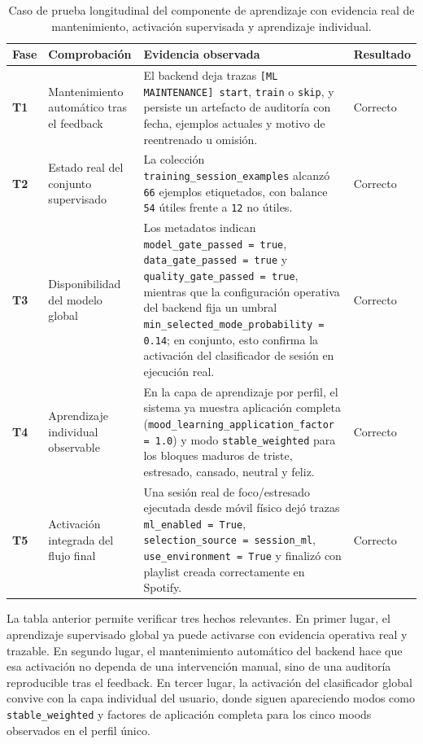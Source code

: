 \begin{table}[H]
\centering
\small
\renewcommand{\arraystretch}{1.1}
\begin{tabularx}{\textwidth}{|P{1.6cm}|P{3.2cm}|Y|P{2.2cm}|}
\hline
\textbf{Fase} & \textbf{Comprobación} & \textbf{Evidencia observada} & \textbf{Resultado} \\
\hline
\textbf{T1} & Mantenimiento automático tras el feedback & El backend deja trazas \texttt{[ML MAINTENANCE] start}, \texttt{train} o \texttt{skip}, y persiste un artefacto de auditoría con fecha, ejemplos actuales y motivo de reentrenado u omisión. & Correcto \\
\hline
\textbf{T2} & Estado real del conjunto supervisado & La colección \texttt{training\_session\_examples} alcanzó \texttt{66} ejemplos etiquetados, con balance \texttt{54} útiles frente a \texttt{12} no útiles. & Correcto \\
\hline
\textbf{T3} & Disponibilidad del modelo global & Los metadatos indican \texttt{model\_gate\_passed = true}, \texttt{data\_gate\_passed = true} y \texttt{quality\_gate\_passed = true}, mientras que la configuración operativa del backend fija un umbral \texttt{min\_selected\_mode\_probability = 0.14}; en conjunto, esto confirma la activación del clasificador de sesión en ejecución real. & Correcto \\
\hline
\textbf{T4} & Aprendizaje individual observable & En la capa de aprendizaje por perfil, el sistema ya muestra aplicación completa (\texttt{mood\_learning\_application\_factor = 1.0}) y modo \texttt{stable\_weighted} para los bloques maduros de triste, estresado, cansado, neutral y feliz. & Correcto \\
\hline
\textbf{T5} & Activación integrada del flujo final & Una sesión real de foco/estresado ejecutada desde móvil físico dejó trazas \texttt{ml\_enabled = True}, \texttt{selection\_source = session\_ml}, \texttt{use\_environment = True} y finalizó con playlist creada correctamente en Spotify. & Correcto \\
\hline
\end{tabularx}
\caption{Caso de prueba longitudinal del componente de aprendizaje con evidencia real de mantenimiento, activación supervisada y aprendizaje individual.}
\label{tab:caso_prueba_ml_longitudinal}
\end{table}

La tabla anterior permite verificar tres hechos relevantes. En primer lugar, el
aprendizaje supervisado global ya puede activarse con evidencia operativa real
y trazable. En segundo lugar, el mantenimiento automático del backend hace que
esa activación no dependa de una intervención manual, sino de una auditoría
reproducible tras el feedback. En tercer lugar, la activación del clasificador
global convive con la capa individual del usuario, donde siguen apareciendo
modos como \texttt{stable\_weighted} y factores de aplicación completa para los
cinco moods observados en el perfil único.


